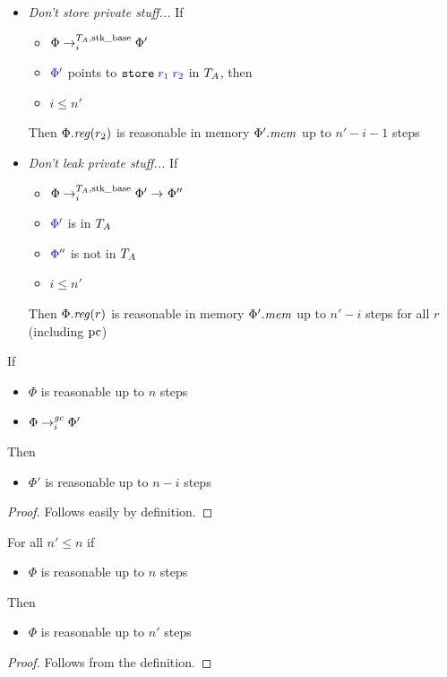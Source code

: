 \documentclass[a4paper]{article}
\begin{document}
\begin{definition}
\begin{itemize}
  \item \emph{Don't store private stuff...} If
    \begin{itemize}
    \item $\Phi \nstep[i]{\ta,\stkb} \Phi'$
    \item $\src{\Phi'}$ points to $\src{\tstore{r_1}{r_2}}$ in $\ta$, then
    \item $i \le n'$
    \end{itemize}
    Then $\Phi.\reg(r_2)$ is reasonable in memory $\Phi'.\mem$ up to $n'-i -1$ steps
  \item \emph{Don't leak private stuff...} If
    \begin{itemize}
    \item $\Phi \nstep[i]{\ta,\stkb} \Phi' \step \Phi''$
    \item $\src{\Phi'}$ is in $\ta$
    \item $\src{\Phi''}$ is not in $\ta$
    \item $i \le n'$
    \end{itemize}
    Then $\Phi.\reg(r)$ is reasonable in memory $\Phi'.\mem$ up to $n'-i$ steps for
    all $r$ (including $\pcreg$)
  \end{itemize}  
\end{definition}

  \begin{lemma}
    \label{lem:ec-reasonable-antired}
    If
    \begin{itemize}
    \item $\Phi$ is reasonable up to $n$ steps
    \item $\Phi \nstep[i]{\gc} \Phi'$
    \end{itemize}
    Then
    \begin{itemize}
    \item $\Phi'$ is reasonable up to $n-i$ steps
    \end{itemize}
  \end{lemma}
  \begin{proof}
    Follows easily by definition.
  \end{proof}

  \begin{lemma}
    \label{lem:ec-reasonable-downwards-closed}
    For all $n' \le n$ if
    \begin{itemize}
    \item $\Phi$ is reasonable up to $n$ steps
    \end{itemize}
    Then
    \begin{itemize}
    \item $\Phi$ is reasonable up to $n'$ steps
    \end{itemize}
  \end{lemma}
  \begin{proof}
    Follows from the definition.
  \end{proof}
\end{document}
